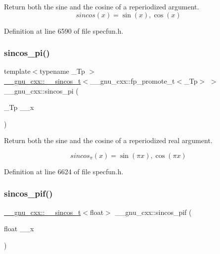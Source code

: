Return both the sine and the cosine of a reperiodized argument. \[ sincos(x) = {\sin(x), \cos(x)} \] 

Definition at line 6590 of file specfun.\+h.

\mbox{\label{group__gnu__math__spec__func_ga6553883f127ea0de67041c3128e03813}} 
\subsubsection{\texorpdfstring{sincos\+\_\+pi()}{sincos\_pi()}}
{\footnotesize\ttfamily template$<$typename \+\_\+\+Tp $>$ \\
\hyperlink{struct____gnu__cxx_1_1____sincos__t}{\+\_\+\+\_\+gnu\+\_\+cxx\+::\+\_\+\+\_\+sincos\+\_\+t}$<$\+\_\+\+\_\+gnu\+\_\+cxx\+::fp\+\_\+promote\+\_\+t$<$\+\_\+\+Tp$>$ $>$ \+\_\+\+\_\+gnu\+\_\+cxx\+::sincos\+\_\+pi (\begin{DoxyParamCaption}\item[{\+\_\+\+Tp}]{\+\_\+\+\_\+x }\end{DoxyParamCaption})\hspace{0.3cm}{\ttfamily [inline]}}

Return both the sine and the cosine of a reperiodized real argument.

\[ sincos_\pi(x) = {\sin(\pi x), \cos(\pi x)} \] 

Definition at line 6624 of file specfun.\+h.

\mbox{\label{group__gnu__math__spec__func_gacf416c867a8a456f8f0e3d8b45ca8bd5}} 
\subsubsection{\texorpdfstring{sincos\+\_\+pif()}{sincos\_pif()}}
{\footnotesize\ttfamily \hyperlink{struct____gnu__cxx_1_1____sincos__t}{\+\_\+\+\_\+gnu\+\_\+cxx\+::\+\_\+\+\_\+sincos\+\_\+t}$<$float$>$ \+\_\+\+\_\+gnu\+\_\+cxx\+::sincos\+\_\+pif (\begin{DoxyParamCaption}\item[{float}]{\+\_\+\+\_\+x }\end{DoxyParamCaption})\hspace{0.3cm}{\ttfamily [inline]}}

